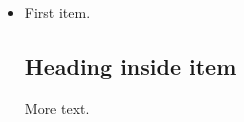 \documentclass{article}
\begin{document}
\begin{itemize}
\item First item.
\subsection{Heading inside item}
More text.
\end{itemize}
\end{document}
